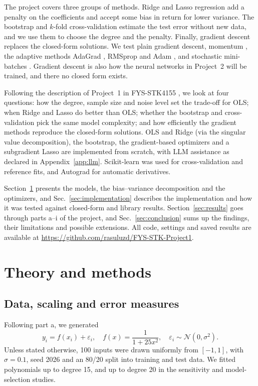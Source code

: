 \documentclass[aps,prb,reprint,superscriptaddress,nofootinbib,longbibliography,floatfix]{revtex4-2}
\begin{document}
The project covers three groups of methods. Ridge \cite{Hoerl1970} and Lasso \cite{Tibshirani1996} regression add a penalty on the coefficients and accept some bias in return for lower variance. The bootstrap \cite{Efron1979} and $k$-fold cross-validation \cite{Hastie2009} estimate the test error without new data, and we use them to choose the degree and the penalty. Finally, gradient descent replaces the closed-form solutions. We test plain gradient descent, momentum \cite{Polyak1964}, the adaptive methods AdaGrad \cite{Duchi2011}, RMSprop \cite{Tieleman2012} and Adam \cite{Kingma2015}, and stochastic mini-batches \cite{Robbins1951}. Gradient descent is also how the neural networks in Project~2 will be trained, and there no closed form exists.

Following the description of Project~1 in FYS-STK4155 \cite{Project1_2026}, we look at four questions: how the degree, sample size and noise level set the trade-off for OLS; when Ridge and Lasso do better than OLS; whether the bootstrap and cross-validation pick the same model complexity; and how efficiently the gradient methods reproduce the closed-form solutions. OLS and Ridge (via the singular value decomposition), the bootstrap, the gradient-based optimizers and a subgradient Lasso are implemented from scratch, with LLM assistance as declared in Appendix~\ref{app:llm}. Scikit-learn \cite{Pedregosa2011} was used for cross-validation and reference fits, and Autograd \cite{Maclaurin2015} for automatic derivatives.

Section~\ref{sec:theory} presents the models, the bias--variance decomposition and the optimizers, and Sec.~\ref{sec:implementation} describes the implementation and how it was tested against closed-form and library results. Section~\ref{sec:results} goes through parts a--i of the project, and Sec.~\ref{sec:conclusion} sums up the findings, their limitations and possible extensions. All code, settings and saved results are available at \url{https://github.com/rasuluzd/FYS-STK-Project1}.

\section{Theory and methods}\label{sec:theory}

\subsection{Data, scaling and error measures}\label{sec:data}\label{sec:scaling}
Following part a, we generated
\begin{equation}
y_i=f(x_i)+\varepsilon_i,\quad f(x)=\frac{1}{1+25x^2},\quad
\varepsilon_i\sim\mathcal N(0,\sigma^2).
\end{equation}
Unless stated otherwise, 100 inputs were drawn uniformly from $[-1,1]$, with $\sigma=0.1$, seed 2026 and an 80/20 split into training and test data. We fitted polynomials up to degree 15, and up to degree 20 in the sensitivity and model-selection studies.
\end{document}
